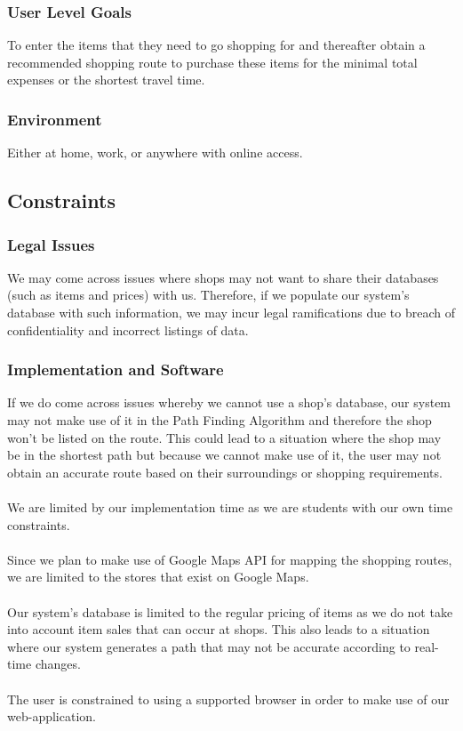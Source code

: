 \documentclass[12pt]{article}
\begin{document}
\subsubsection{User Level Goals}
To enter the items that they need to go shopping for and thereafter obtain a recommended shopping route to purchase these items for the minimal total expenses or the shortest travel time.
\subsubsection{Environment}
Either at home, work, or anywhere with online access.

\subsection{Constraints}
\subsubsection{Legal Issues}
We may come across issues where shops may not want to share their databases (such as items and prices) with us. Therefore, if we populate our system's database with such information, we may incur legal ramifications due to breach of confidentiality and incorrect listings of data. 
\subsubsection{Implementation and Software}
If we do come across issues whereby we cannot use a shop's database, our system may not make use of it in the Path Finding Algorithm and therefore the shop won't be listed on the route. This could lead to a situation where the shop may be in the shortest path but because we cannot make use of it, the user may not obtain an accurate route based on their surroundings or shopping requirements.\\\\
We are limited by our implementation time as we are students with our own time constraints.\\\\
Since we plan to make use of Google Maps API for mapping the shopping routes, we are limited to the stores that exist on Google Maps.\\\\
Our system's database is limited to the regular pricing of items as we do not take into account item sales that can occur at shops. This also leads to a situation where our system generates a path that may not be accurate according to real-time changes.\\\\
The user is constrained to using a supported browser in order to make use of our web-application.
\end{document}
